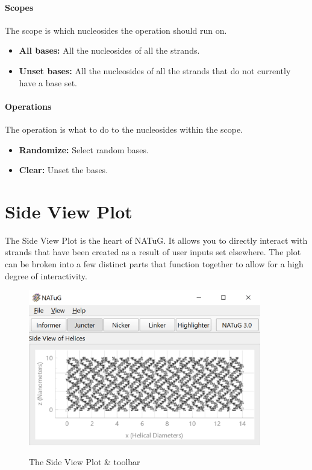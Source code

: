 \documentclass[titlepage]{article}
\begin{document}
	\paragraph{Scopes}
	The scope is which nucleosides the operation should run on.
	
	\begin{itemize}
		\item \textbf{All bases:} All the nucleosides of all the strands.
		\item \textbf{Unset bases:} All the nucleosides of all the strands that do not currently have a base set.
	\end{itemize}

	\paragraph{Operations}
	The operation is what to do to the nucleosides within the scope.
	
	\begin{itemize}
		\item \textbf{Randomize:} Select random bases.
		\item \textbf{Clear:} Unset the bases.
	\end{itemize}
	
	\newpage
	\section{Side View Plot}
	The Side View Plot is the heart of NATuG. It allows you to directly interact with strands that have been created as a result of user inputs set elsewhere. The plot can be broken into a few distinct parts that function together to allow for a high degree of interactivity. 
	
	\begin{figure}[h]
		\centering
		\caption{The Side View Plot \& toolbar}
		\includegraphics[width=4in]{short-side-view-overview.png}
		\label{fig:short-side-view-overview}
	\end{figure}
\end{document}
